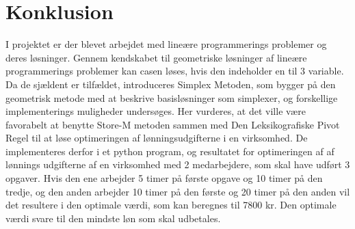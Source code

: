 \chapter{Konklusion}
I projektet er der blevet arbejdet med lineære programmerings problemer og deres løsninger.
Gennem kendskabet til geometriske løsninger af lineære programmerings problemer kan casen løses, hvis den indeholder en til 3 variable.
Da de sjældent er tilfældet, introduceres Simplex Metoden, som bygger på den geometrisk metode med at beskrive basisløsninger som simplexer, og 
forskellige implementerings muligheder undersøges. 
Her vurderes, at det ville være favorabelt at benytte Store-M metoden sammen med Den Leksikografiske Pivot Regel til at løse optimeringen af lønningsudgifterne i en virksomhed.
De implementeres derfor i et python program, og resultatet for optimeringen af af lønnings udgifterne af en virksomhed med 2 medarbejdere, som skal have udført 3 opgaver. 
Hvis den ene arbejder 5 timer på første opgave og 10 timer på den tredje, og den anden arbejder 10 timer på den første og 20 timer på den anden vil det resultere i den optimale værdi, som kan beregnes til 7800 kr. Den optimale værdi svare til den mindste løn som skal udbetales.